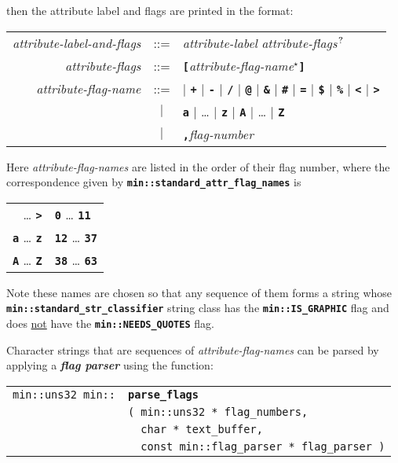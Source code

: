 \documentclass[12pt]{article}
\makeatletter
\newcommand{\TT}[1]{{\tt \bfseries #1}}
\newcommand{\QMARK}{{$^{\,\mbox{\footnotesize ?}}$}}
\newcommand{\key}[1]{{\bf \em #1}\index{#1}}
\newcommand{\ttindex}[1]{\index{#1@{\tt #1}}}
\newcommand{\EOL}{\penalty \exhyphenpenalty}
\newenvironment{indpar}[1][0.3in]%
	{\begin{list}{}%
		     {\setlength{\itemsep}{0in}%
		      \setlength{\topsep}{0in}%
		      \setlength{\parsep}{1ex}%
		      \setlength{\labelwidth}{#1}%
		      \setlength{\leftmargin}{#1}%
		      \addtolength{\leftmargin}{\labelsep}}%
	 \item}%
	{\end{list}}
\newcommand{\LABEL}[1]{\label{#1}}
\newlength{\ARGBREAKLENGTH}
\newcommand{\ARGBREAK}[1][\ARGBREAKLENGTH]{\\&\hspace*{#1}}
\newcommand{\MINKEY}[1]%
	   {\TT{#1}\ttindex{min::#1}\ttindex{#1}}
\makeatother
\begin{document}
then the attribute label and flags are printed in the format:

\newcommand{\TTBS}[1]{\TT{\textbackslash#1}}
\begin{center}
\begin{tabular}{rcl}
{\em attribute-label-and-flags} & ::= & {\em attribute-label}
                                        {\em attribute-flags}\QMARK{} \\
{\em attribute-flags}
    & ::= & \TT{[}{\em attribute-flag-name}$^\star$\TT{]} \\
{\em attribute-flag-name} & ::= &
        \TT{*} $|$ \TT{+} $|$ \TT{-} $|$ \TT{/} $|$ \TT{@}
    $|$ \TT{\&} $|$ \TT{\#} $|$ \TT{=} $|$ \TT{\$}
    $|$ \TT{\%} $|$ \TT{<} $|$ \TT{>} \\
& $|$ & \TT{a} $|$ \ldots{} $|$ \TT{z} $|$ \TT{A} $|$ \ldots{} $|$ \TT{Z} \\
& $|$ & \TT{,}{\em flag-number}
\end{tabular}
\end{center}

Here {\em attribute-flag-names} are listed in the order of their flag number,
where the correspondence given
by \TT{min::\EOL standard\_\EOL attr\_\EOL flag\_\EOL names} is
\begin{center}
\begin{tabular}{r@{~correspond to flag numbers~}l}
\TT{*} \ldots{} \TT{>} & \TT{0} \ldots{} \TT{11} \\
\TT{a} \ldots{} \TT{z} & \TT{12} \ldots{} \TT{37} \\
\TT{A} \ldots{} \TT{Z} & \TT{38} \ldots{} \TT{63} \\
\end{tabular}
\end{center}

Note these names are chosen so that any sequence of them forms
a string whose \TT{min::stan\-dard\_\EOL str\_\EOL classifier} string
class has the \TT{min::\EOL IS\_\EOL GRAPHIC} flag and does
\underline{not} have the \TT{min::\EOL NEEDS\_\EOL QUOTES} flag.

Character strings that are sequences of {\em attribute-flag-names}
can be parsed by applying a \key{flag parser} using the function:

\begin{indpar}[1em]\begin{tabular}{r@{}l}
\verb|min::uns32 min::| & \MINKEY{parse\_flags}\ARGBREAK
    \verb|( min::uns32 * flag_numbers,|\ARGBREAK
    \verb|  char * text_buffer,|\ARGBREAK
    \verb|  const min::flag_parser * flag_parser )|
\LABEL{MIN::PARSE_FLAGS} \\
\end{tabular}\end{indpar}
\end{document}

